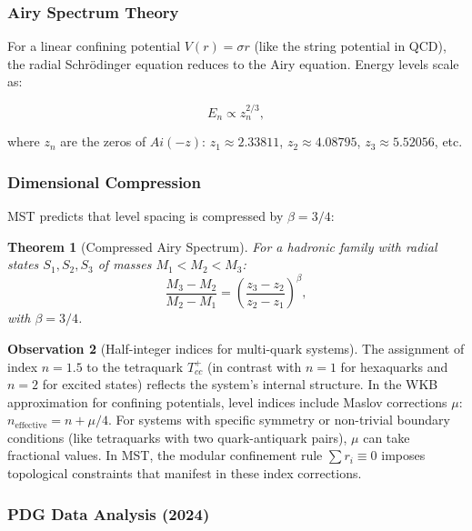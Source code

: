 \documentclass[11pt, a4paper]{article}
\theoremstyle{plain}
\newtheorem{theorem}{Theorem}[section]
\theoremstyle{definition}
\newtheorem{observation}[theorem]{Observation}
\begin{document}
\subsubsection{Airy Spectrum Theory}

For a linear confining potential $V(r) = \sigma r$ (like the string potential in QCD), the radial Schrödinger equation reduces to the Airy equation. Energy levels scale as:

\begin{equation}
E_n \propto z_n^{2/3},
\end{equation}

where $z_n$ are the zeros of $Ai(-z)$: $z_1 \approx 2.33811$, $z_2 \approx 4.08795$, $z_3 \approx 5.52056$, etc.

\subsubsection{Dimensional Compression}

MST predicts that level spacing is compressed by $\beta = 3/4$:

\begin{theorem}[Compressed Airy Spectrum]
For a hadronic family with radial states $S_1, S_2, S_3$ of masses $M_1 < M_2 < M_3$:
\begin{equation}
\frac{M_3 - M_2}{M_2 - M_1} = \left(\frac{z_3 - z_2}{z_2 - z_1}\right)^\beta,
\label{eq:airy_compressed}
\end{equation}
with $\beta = 3/4$.
\end{theorem}

\begin{observation}[Half-integer indices for multi-quark systems]
The assignment of index $n=1.5$ to the tetraquark $T_{cc}^+$ (in contrast with $n=1$ for hexaquarks and $n=2$ for excited states) reflects the system's internal structure. In the WKB approximation for confining potentials, level indices include Maslov corrections $\mu$: $n_{\text{effective}} = n + \mu/4$. For systems with specific symmetry or non-trivial boundary conditions (like tetraquarks with two quark-antiquark pairs), $\mu$ can take fractional values. In MST, the modular confinement rule $\sum r_i \equiv 0$ imposes topological constraints that manifest in these index corrections.
\end{observation}

\subsubsection{PDG Data Analysis (2024)}
\end{document}
